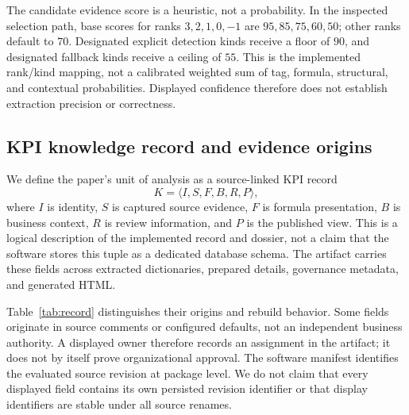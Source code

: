\documentclass[a4paper,fleqn]{cas-dc}
\begin{document}
The candidate evidence score is a heuristic, not a probability. In the inspected selection path, base scores for ranks $3,2,1,0,-1$ are $95,85,75,60,50$; other ranks default to $70$. Designated explicit detection kinds receive a floor of $90$, and designated fallback kinds receive a ceiling of $55$. This is the implemented rank/kind mapping, not a calibrated weighted sum of tag, formula, structural, and contextual probabilities. Displayed confidence therefore does not establish extraction precision or correctness.

\subsection{KPI knowledge record and evidence origins}
\label{sec:record}

We define the paper's unit of analysis as a source-linked KPI record
\begin{equation}
 K=\langle I,S,F,B,R,P\rangle,
\end{equation}
where $I$ is identity, $S$ is captured source evidence, $F$ is formula presentation, $B$ is business context, $R$ is review information, and $P$ is the published view. This is a logical description of the implemented record and dossier, not a claim that the software stores this tuple as a dedicated database schema. The artifact carries these fields across extracted dictionaries, prepared details, governance metadata, and generated HTML.

Table~\ref{tab:record} distinguishes their origins and rebuild behavior. Some fields originate in source comments or configured defaults, not an independent business authority. A displayed owner therefore records an assignment in the artifact; it does not by itself prove organizational approval. The software manifest identifies the evaluated source revision at package level. We do not claim that every displayed field contains its own persisted revision identifier or that display identifiers are stable under all source renames.
\end{document}
